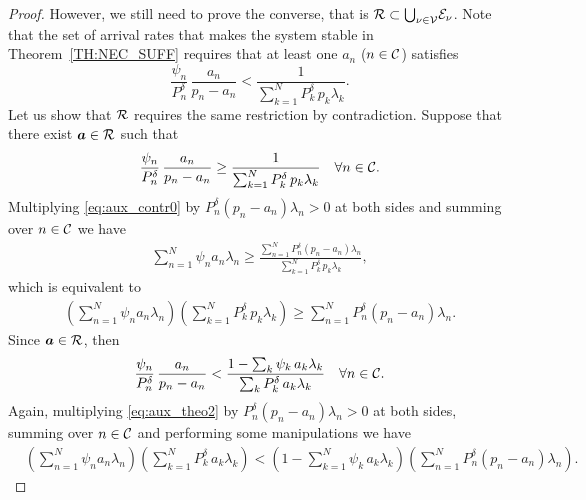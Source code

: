 \begin{proof}
    However, we still need to prove the converse, that is ${\cal{R} \subset \bigcup_{\nu\in\cal{V}}} \cal{E}_\nu$.
    Note that the set of arrival rates that makes the system stable in Theorem~\ref{TH:NEC_SUFF} requires that at least one $a_n$ ($n\in\cal{C}$) satisfies
    \begin{equation} \label{eq:aux_stab_first}
    	\dfrac{\psi_n}{P_n^\delta}\,\dfrac{a_n}{p_n-a_n} <
        \dfrac{1}{\sum_{k=1}^N P_k^\delta\,p_k \lambda_k}.
    \end{equation}
    	Let us show that $\cal{R}$ requires the same restriction by contradiction. Suppose that there exist $\bm{a}\in\cal{R}$ such that
    \begin{equation} \label{eq:aux_contr0}
        \dfrac{\psi_n}{P_n^\delta}\,\dfrac{a_n}{p_n-a_n} \ge
        \dfrac{1}{\sum_{k=1}^N P_k^\delta\,p_k \lambda_k}
        \quad \forall n \in \cal{C}.
    \end{equation}
    Multiplying \eqref{eq:aux_contr0} by $P_n^\delta(p_n-a_n)\lambda_n > 0$ at both sides and summing over $n\in\cal{C}$ we have
    \begin{align*}
        \sum_{n=1}^N \psi_n a_n \lambda_n 
            \ge \frac{\sum_{n=1}^N P_n^\delta (p_n-a_n) \lambda_n}
            {\sum_{k=1}^N P_k^\delta\,p_k \lambda_k},
    \end{align*}
    which is equivalent to
    \begin{align} \label{eq:aux_case0}
        \left(\sum_{n=1}^N \psi_n a_n \lambda_n \right)
            \left(\sum_{k=1}^N P_k^\delta\,p_k \lambda_k \right)
            \ge \sum_{n=1}^N P_n^\delta (p_n-a_n) \lambda_n.
    \end{align}
    Since $\bm{a}\in\cal{R}$, then
    \begin{align} \label{eq:aux_theo2}
        \dfrac{\psi_n}{P_n^\delta}\,\dfrac{a_n}{p_n-a_n} < 
            \dfrac{1 - \sum_{k} \psi_k\,a_k \lambda_k}
            {\sum_{k} P_k^{\delta}\,a_k \lambda_k} \quad \forall n\in\cal{C}.
    \end{align}
    Again, multiplying \eqref{eq:aux_theo2} by $P_n^\delta(p_n-a_n)\lambda_n > 0$ at both sides, summing over $n\in\cal{C}$ and performing some manipulations we have
    \begin{align} \label{eq:aux_theo2_case0}
        &\left(\sum_{n=1}^N \psi_n a_n \lambda_n \right)
            \left(\sum_{k=1}^N P_k^\delta\,a_k \lambda_k \right) < \left(1 - \sum_{k=1}^N \psi_k\,a_k \lambda_k \right)\left(\sum_{n=1}^N P_n^\delta (p_n-a_n) \lambda_n\right).

\end{align}
\end{proof}
